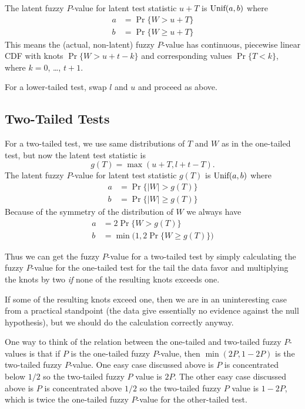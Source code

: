 \documentclass{article}
\newcommand{\UniformDis}{\text{\upshape Unif}}
\begin{document}
The latent fuzzy $P$-value for latent test statistic $u + T$
is $\UniformDis(a, b)$ where
\begin{align*}
   a & = \Pr\{ W > u + T \}
   \\
   b & = \Pr\{ W \ge u + T \}
\end{align*}
This means the (actual, non-latent) fuzzy $P$-value has continuous,
piecewise linear CDF with
knots $\Pr\{ W > u + t - k \}$ and corresponding values
$\Pr\{ T < k \}$, where $k = 0$, \ldots, $t + 1$.

For a lower-tailed test, swap $l$ and $u$ and proceed as above.

\subsection{Two-Tailed Tests}

For a two-tailed test, we use same distributions of $T$ and $W$ as in
the one-tailed test, but now the latent test statistic is
$$
   g(T) = \max(u + T, l + t - T).
$$
The latent fuzzy $P$-value
for latent test statistic $g(T)$ is $\UniformDis(a, b)$ where
\begin{align*}
   a & = \Pr\{ \lvert W \rvert > g(T) \}
   \\
   b & = \Pr\{ \lvert W \rvert \ge g(T) \}
\end{align*}
Because of the symmetry of the distribution of $W$ we always have
\begin{align*}
   a & = 2 \Pr\{ W > g(T) \}
   \\
   b & = \min\bigl( 1, 2 \Pr\{ W \ge g(T) \} \bigr)
\end{align*}

Thus we can get the fuzzy $P$-value for a two-tailed test by simply
calculating the fuzzy $P$-value for the one-tailed test for the tail
the data favor and multiplying the knots by two \emph{if} none of the
resulting knots exceeds one.

If some of the resulting knots exceed one, then we are in an uninteresting
case from a practical standpoint (the data give essentially no evidence
against the null hypothesis), but we should do the calculation correctly
anyway.

One way to think of the relation between the one-tailed and two-tailed
fuzzy $P$-values is that if $P$ is the one-tailed fuzzy $P$-value,
then $\min(2 P, 1 - 2 P)$ is the two-tailed fuzzy $P$-value.
One easy case discussed above is $P$ is concentrated below $1 / 2$
so the two-tailed fuzzy $P$ value is $2 P$.
The other easy case discussed above is $P$ is concentrated above $1 / 2$
so the two-tailed fuzzy $P$ value is $1 - 2 P$, which is twice the one-tailed
fuzzy $P$-value for the other-tailed test.
\end{document}
